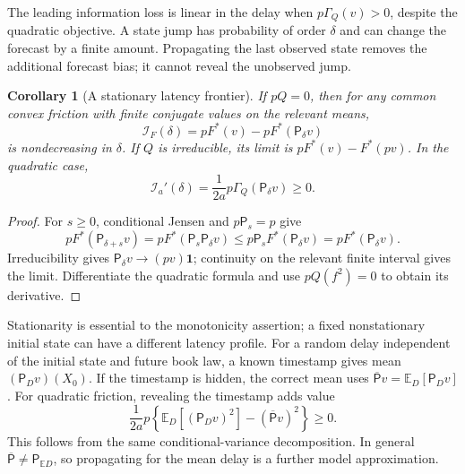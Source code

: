 \documentclass[11pt]{article}
\theoremstyle{plain}
\newtheorem{corollary}[theorem]{Corollary}
\theoremstyle{definition}
\theoremstyle{remark}
\newcommand{\E}{\mathbb E}
\begin{document}
The leading information loss is linear in the delay when
\(p\Gamma_Q(v)>0\), despite the quadratic objective.
A state jump has probability of order \(\delta\) and can change
the forecast by a finite amount. Propagating the last observed
state removes the additional forecast bias; it cannot reveal the
unobserved jump.

\begin{corollary}[A stationary latency frontier]
\label{cor:stationarylatency}
If \(pQ=0\), then for any common convex friction with finite
conjugate values on the relevant means,
\[
 \mathcal I_F(\delta)
 =pF^*(v)-pF^*(\mathsf P_\delta v)
\]
is nondecreasing in \(\delta\). If \(Q\) is irreducible, its
limit is \(pF^*(v)-F^*(pv)\).
In the quadratic case,
\[
 \mathcal I_a'(\delta)
 =\frac1{2a}p\Gamma_Q(\mathsf P_\delta v)\ge0.
\]
\end{corollary}
\begin{proof}
For \(s\ge0\), conditional Jensen and \(p\mathsf P_s=p\) give
\[
 pF^*(\mathsf P_{\delta+s}v)
 =pF^*(\mathsf P_s\mathsf P_\delta v)
 \le p\mathsf P_sF^*(\mathsf P_\delta v)
 =pF^*(\mathsf P_\delta v).
\]
Irreducibility gives
\(\mathsf P_\delta v\to(pv)\mathbf1\); continuity on the
relevant finite interval gives the limit. Differentiate the
quadratic formula and use \(pQ(f^2)=0\) to obtain its derivative.
\end{proof}

Stationarity is essential to the monotonicity assertion; a fixed
nonstationary initial state can have a different latency profile.
For a random delay independent of the initial state and future
book law, a known timestamp gives mean
\((\mathsf P_Dv)(X_0)\). If the timestamp is hidden, the correct
mean uses \(\overline{\mathsf P}v=\E_D[\mathsf P_Dv]\).
For quadratic friction, revealing the timestamp adds value
\begin{equation}\label{eq:timestampvalue}
 \frac1{2a}p\left\{\E_D[(\mathsf P_Dv)^2]
                   -(\overline{\mathsf P}v)^2\right\}\ge0.
\end{equation}
This follows from the same conditional-variance decomposition.
In general \(\overline{\mathsf P}\ne\mathsf P_{\E D}\), so
propagating for the mean delay is a further model approximation.
\end{document}
